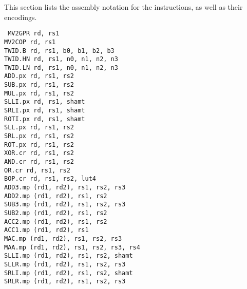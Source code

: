 
This section lists the assembly notation for the instructions, as well as
their encodings.

{\tt
MV2GPR      rd, rs1                 \\
MV2COP      rd, rs1                 \\
TWID.B      rd, rs1, b0, b1, b2, b3 \\
TWID.HN     rd, rs1, n0, n1, n2, n3 \\
TWID.LN     rd, rs1, n0, n1, n2, n3 \\
ADD.px      rd, rs1, rs2            \\
SUB.px      rd, rs1, rs2            \\
MUL.px      rd, rs1, rs2            \\
SLLI.px     rd, rs1, shamt          \\
SRLI.px     rd, rs1, shamt          \\
ROTI.px     rd, rs1, shamt          \\
SLL.px      rd, rs1, rs2            \\
SRL.px      rd, rs1, rs2            \\
ROT.px      rd, rs1, rs2            \\
XOR.cr      rd, rs1, rs2            \\
AND.cr      rd, rs1, rs2            \\
OR.cr       rd, rs1, rs2            \\
BOP.cr      rd, rs1, rs2, lut4      \\
ADD3.mp     (rd1, rd2),  rs1, rs2, rs3 \\
ADD2.mp     (rd1, rd2),  rs1, rs2  \\
SUB3.mp     (rd1, rd2),  rs1, rs2, rs3 \\
SUB2.mp     (rd1, rd2),  rs1, rs2  \\
ACC2.mp     (rd1, rd2),  rs1, rs2  \\
ACC1.mp     (rd1, rd2),  rs1       \\
MAC.mp      (rd1, rd2),  rs1, rs2, rs3 \\
MAA.mp      (rd1, rd2),  rs1, rs2, rs3, rs4 \\
SLLI.mp     (rd1, rd2),  rs1, rs2, shamt \\
SLLR.mp     (rd1, rd2),  rs1, rs2, rs3 \\
SRLI.mp     (rd1, rd2),  rs1, rs2, shamt \\
SRLR.mp     (rd1, rd2),  rs1, rs2, rs3 \\
}

